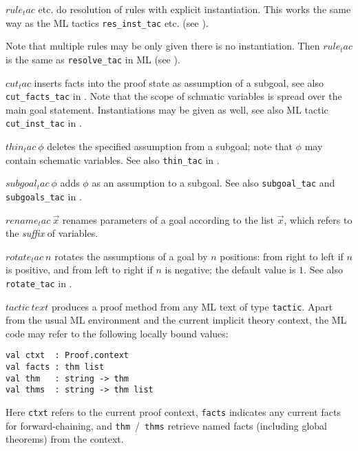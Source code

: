 \begin{descr}
\item [$rule_tac$ etc.] do resolution of rules with explicit instantiation.
  This works the same way as the ML tactics \texttt{res_inst_tac} etc. (see
  \cite[\S3]{isabelle-ref}).

  Note that multiple rules may be only given there is no instantiation.  Then
  $rule_tac$ is the same as \texttt{resolve_tac} in ML (see
  \cite[\S3]{isabelle-ref}).
\item [$cut_tac$] inserts facts into the proof state as assumption of a
  subgoal, see also \texttt{cut_facts_tac} in \cite[\S3]{isabelle-ref}.  Note
  that the scope of schmatic variables is spread over the main goal statement.
  Instantiations may be given as well, see also ML tactic
  \texttt{cut_inst_tac} in \cite[\S3]{isabelle-ref}.
\item [$thin_tac~\phi$] deletes the specified assumption from a subgoal; note
  that $\phi$ may contain schematic variables.  See also \texttt{thin_tac} in
  \cite[\S3]{isabelle-ref}.
\item [$subgoal_tac~\phi$] adds $\phi$ as an assumption to a subgoal.  See
  also \texttt{subgoal_tac} and \texttt{subgoals_tac} in
  \cite[\S3]{isabelle-ref}.
\item [$rename_tac~\vec x$] renames parameters of a goal according to the list
  $\vec x$, which refers to the \emph{suffix} of variables.
\item [$rotate_tac~n$] rotates the assumptions of a goal by $n$ positions:
  from right to left if $n$ is positive, and from left to right if $n$ is
  negative; the default value is $1$.  See also \texttt{rotate_tac} in
  \cite[\S3]{isabelle-ref}.
\item [$tactic~text$] produces a proof method from any ML text of type
  \texttt{tactic}.  Apart from the usual ML environment and the current
  implicit theory context, the ML code may refer to the following locally
  bound values:

{\footnotesize\begin{verbatim}
val ctxt  : Proof.context
val facts : thm list
val thm   : string -> thm
val thms  : string -> thm list
\end{verbatim}}
  Here \texttt{ctxt} refers to the current proof context, \texttt{facts}
  indicates any current facts for forward-chaining, and
  \texttt{thm}~/~\texttt{thms} retrieve named facts (including global
  theorems) from the context.
\end{descr}


